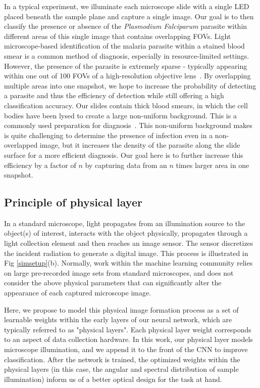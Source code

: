 \documentclass{article}
\begin{document}
In a typical experiment, we illuminate each microscope slide with a single LED placed beneath the sample plane and capture a single image. Our goal is to then classify the presence or absence of the {\it Plasmodium Falciparum} parasite within different areas of this single image that contains overlapping FOVs. Light microscope-based identification of the malaria parasite within a stained blood smear is a common method of diagnosis, especially in resource-limited settings. However, the presence of the parasite is extremely sparse - typically appearing within one out of 100 FOVs of a high-resolution objective lens~\cite{Das15}. By overlapping multiple areas into one snapshot, we hope to increase the probability of detecting a parasite and thus the efficiency of detection while still offering a high classification accuracy. Our slides contain thick blood smears, in which the cell bodies have been lysed to create a large non-uniform background. This is a commonly used preparation for diagnosis~\cite{Das15}. This non-uniform background makes is quite challenging to determine the presence of infection even in a non-overlapped image, but it increases the density of the parasite along the slide surface for a more efficient diagnosis. Our goal here is to further increase this efficiency by a factor of $n$ by capturing data from an $n$ times larger area in one snapshot.

\subsection{Principle of physical layer}

In a standard microscope, light propagates from an illumination source to the object(s) of interest, interacts with the object physically, propagates through a light collection element and then reaches an image sensor. The sensor discretizes the incident radiation to generate a digital image. This process is illustrated in Fig \ref{simsetup}(b). Normally, work within the machine learning community relies on large pre-recorded image sets from standard microscopes, and does not consider the above physical parameters that can significantly alter the appearance of each captured microscope image.

Here, we propose to model this physical image formation process as a set of learnable weights within the early layers of our neural network, which are typically referred to as "physical layers". Each physical layer weight corresponds to an aspect of data collection hardware. In this work, our physical layer models microscope illumination, and we append it to the front of the CNN to improve classification. After the network is trained, the optimized weights within the physical layers (in this case, the angular and spectral distribution of sample illumination) inform us of a better optical design for the task at hand.
\end{document}
